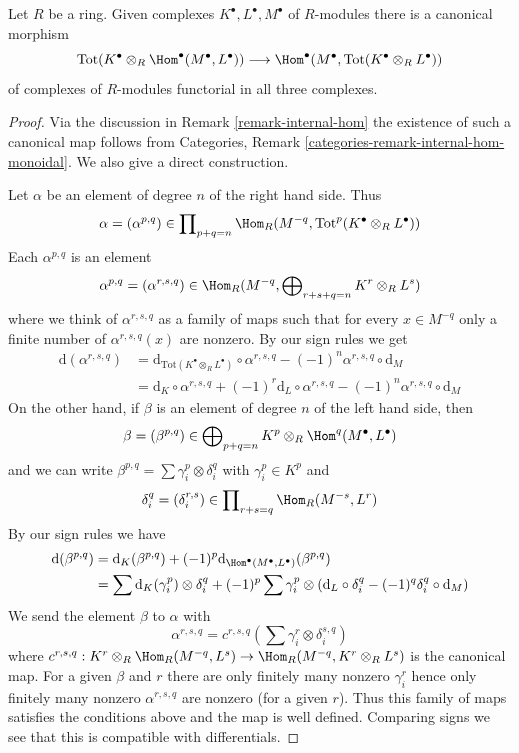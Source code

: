 \begin{lemma}
\label{lemma-diagonal-better}
Let $R$ be a ring. Given complexes $K^\bullet, L^\bullet, M^\bullet$
of $R$-modules there is a canonical morphism
$$
\text{Tot}(K^\bullet \otimes_R \Hom^\bullet(M^\bullet, L^\bullet))
\longrightarrow
\Hom^\bullet(M^\bullet, \text{Tot}(K^\bullet \otimes_R L^\bullet))
$$
of complexes of $R$-modules functorial in all three complexes.
\end{lemma}

\begin{proof}
Via the discussion in Remark \ref{remark-internal-hom} the existence
of such a canonical map follows from
Categories, Remark \ref{categories-remark-internal-hom-monoidal}.
We also give a direct construction.

\medskip\noindent
Let $\alpha$ be an element of degree $n$ of the right hand side.
Thus
$$
\alpha = (\alpha^{p, q}) \in \prod\nolimits_{p + q = n}
\Hom_R(M^{-q}, \text{Tot}^p(K^\bullet \otimes_R L^\bullet))
$$
Each $\alpha^{p, q}$ is an element
$$
\alpha^{p, q} = (\alpha^{r, s, q}) \in
\Hom_R(M^{-q}, \bigoplus\nolimits_{r + s + q = n} K^r \otimes_R L^s)
$$
where we think of $\alpha^{r, s, q}$ as a family of maps such that
for every $x \in M^{-q}$ only a finite number of
$\alpha^{r, s, q}(x)$ are nonzero. By our sign rules we get
\begin{align*}
\text{d}(\alpha^{r, s, q})
& =
\text{d}_{\text{Tot}(K^\bullet \otimes_R L^\bullet)} \circ \alpha^{r, s, q}
- (-1)^n \alpha^{r, s, q} \circ \text{d}_M \\
& =
\text{d}_K \circ \alpha^{r, s, q} + (-1)^r \text{d}_L \circ \alpha^{r, s, q}
- (-1)^n \alpha^{r, s, q} \circ \text{d}_M
\end{align*}
On the other hand, if $\beta$ is an element of degree $n$ of the
left hand side, then
$$
\beta = (\beta^{p, q}) \in
\bigoplus\nolimits_{p + q = n} K^p \otimes_R \Hom^q(M^\bullet, L^\bullet)
$$
and we can write $\beta^{p, q} = \sum \gamma_i^p \otimes \delta_i^q$ with
$\gamma_i^p \in K^p$ and
$$
\delta_i^q = (\delta_i^{r, s}) \in
\prod\nolimits_{r + s = q} \Hom_R(M^{-s}, L^r)
$$
By our sign rules we have
\begin{align*}
\text{d}(\beta^{p, q})
& =
\text{d}_K(\beta^{p, q}) +
(-1)^p \text{d}_{\Hom^\bullet(M^\bullet, L^\bullet)}(\beta^{p, q}) \\
& =
\sum \text{d}_K(\gamma_i^p) \otimes \delta_i^q +
(-1)^p \sum \gamma_i^p \otimes
(\text{d}_L \circ \delta_i^q - (-1)^q \delta_i^q \circ \text{d}_M)
\end{align*}
We send the element $\beta$ to $\alpha$ with
$$
\alpha^{r, s, q} = c^{r, s, q}(\sum \gamma_i^r \otimes \delta_i^{s, q})
$$
where $c^{r, s, q} : K^r \otimes_R \Hom_R(M^{-q}, L^s) \to
\Hom_R(M^{-q}, K^r \otimes_R L^s)$ is the canonical map.
For a given $\beta$ and $r$ there are only finitely many nonzero
$\gamma_i^r$ hence only finitely many nonzero $\alpha^{r, s, q}$
are nonzero (for a given $r$). Thus this family of maps satisfies
the conditions above and the map is well defined.
Comparing signs we see that this is compatible with differentials.
\end{proof}

